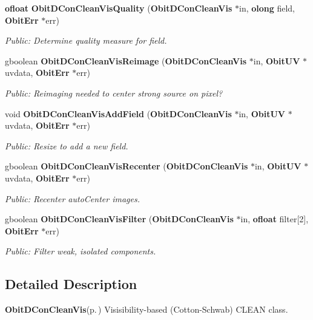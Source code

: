 \begin{CompactItemize}
{\bf ofloat} {\bf Obit\-DCon\-Clean\-Vis\-Quality} ({\bf Obit\-DCon\-Clean\-Vis} $\ast$in, {\bf olong} field, {\bf Obit\-Err} $\ast$err)
\begin{CompactList}\small\item\em Public: Determine quality measure for field. \item\end{CompactList}\item 
gboolean {\bf Obit\-DCon\-Clean\-Vis\-Reimage} ({\bf Obit\-DCon\-Clean\-Vis} $\ast$in, {\bf Obit\-UV} $\ast$uvdata, {\bf Obit\-Err} $\ast$err)
\begin{CompactList}\small\item\em Public: Reimaging needed to center strong source on pixel? \item\end{CompactList}\item 
void {\bf Obit\-DCon\-Clean\-Vis\-Add\-Field} ({\bf Obit\-DCon\-Clean\-Vis} $\ast$in, {\bf Obit\-UV} $\ast$uvdata, {\bf Obit\-Err} $\ast$err)
\begin{CompactList}\small\item\em Public: Resize to add a new field. \item\end{CompactList}\item 
gboolean {\bf Obit\-DCon\-Clean\-Vis\-Recenter} ({\bf Obit\-DCon\-Clean\-Vis} $\ast$in, {\bf Obit\-UV} $\ast$uvdata, {\bf Obit\-Err} $\ast$err)
\begin{CompactList}\small\item\em Public: Recenter auto\-Center images. \item\end{CompactList}\item 
gboolean {\bf Obit\-DCon\-Clean\-Vis\-Filter} ({\bf Obit\-DCon\-Clean\-Vis} $\ast$in, {\bf ofloat} filter[2], {\bf Obit\-Err} $\ast$err)
\begin{CompactList}\small\item\em Public: Filter weak, isolated components. \item\end{CompactList}\end{CompactItemize}


\subsection{Detailed Description}
{\bf Obit\-DCon\-Clean\-Vis}{\rm (p.\,\pageref{structObitDConCleanVis})} Visisibility-based (Cotton-Schwab) CLEAN class. 

